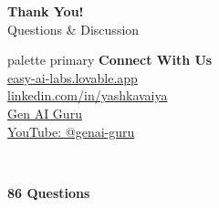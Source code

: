 \documentclass[aspectratio=169]{beamer}
\begin{document}
{
\begin{frame}
    
    \begin{center}
        {\Huge \color{googleblue}\textbf{Thank You!}}\\
        \vspace{0.4cm}
        {\LARGE \color{darkgray}Questions \& Discussion}\\
        
        \vspace{0.8cm}
        
        \begin{minipage}{0.7\textwidth}
            \centering
            \begin{beamercolorbox}[wd=\textwidth,sep=12pt,center,rounded=true,shadow=true]{palette primary}
                \color{white}
                \textbf{Connect With Us}\\
                \vspace{0.4cm}
                 \href{https://easy-ai-labs.lovable.app/}{\color{white}easy-ai-labs.lovable.app}\\
                \vspace{0.2cm}
                 \href{https://www.linkedin.com/in/yashkavaiya}{\color{white}linkedin.com/in/yashkavaiya}\\
                \vspace{0.2cm}
                 \href{https://www.linkedin.com/company/genai-guru}{\color{white}Gen AI Guru}\\
                \vspace{0.2cm}
                 \href{https://youtube.com/@genai-guru}{\color{white}YouTube: @genai-guru}
            \end{beamercolorbox}
        \end{minipage}
        
        \vspace{0.8cm}
        
        \begin{columns}[T]
            \begin{center}
                \textcolor{googlered}{\Large{}}\\
                \small\textbf{86 Questions}
            \end{center}
            

\end{columns}
\end{center}
\end{frame}}
\end{document}
